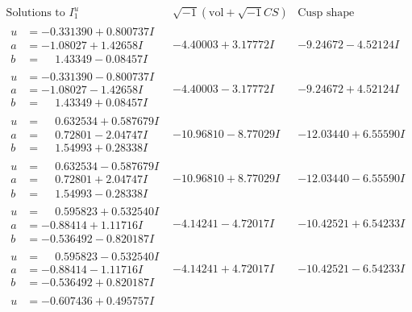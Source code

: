 \documentclass[1p]{elsarticle_modified}
\theoremstyle{definition}
\newcommand{\I}{\sqrt{-1}}
\begin{document}
$$\begin{array}{c|c|c}  
\text{Solutions to }I^u_{1}& \I (\text{vol} + \sqrt{-1}CS) & \text{Cusp shape}\\
 \hline 
\begin{aligned}
u &= -0.331390 + 0.800737 I \\
a &= -1.08027 + 1.42658 I \\
b &= \phantom{-}1.43349 - 0.08457 I\end{aligned}
 & -4.40003 + 3.17772 I & -9.24672 - 4.52124 I \\ \hline\begin{aligned}
u &= -0.331390 - 0.800737 I \\
a &= -1.08027 - 1.42658 I \\
b &= \phantom{-}1.43349 + 0.08457 I\end{aligned}
 & -4.40003 - 3.17772 I & -9.24672 + 4.52124 I \\ \hline\begin{aligned}
u &= \phantom{-}0.632534 + 0.587679 I \\
a &= \phantom{-}0.72801 - 2.04747 I \\
b &= \phantom{-}1.54993 + 0.28338 I\end{aligned}
 & -10.96810 - 8.77029 I & -12.03440 + 6.55590 I \\ \hline\begin{aligned}
u &= \phantom{-}0.632534 - 0.587679 I \\
a &= \phantom{-}0.72801 + 2.04747 I \\
b &= \phantom{-}1.54993 - 0.28338 I\end{aligned}
 & -10.96810 + 8.77029 I & -12.03440 - 6.55590 I \\ \hline\begin{aligned}
u &= \phantom{-}0.595823 + 0.532540 I \\
a &= -0.88414 + 1.11716 I \\
b &= -0.536492 - 0.820187 I\end{aligned}
 & -4.14241 - 4.72017 I & -10.42521 + 6.54233 I \\ \hline\begin{aligned}
u &= \phantom{-}0.595823 - 0.532540 I \\
a &= -0.88414 - 1.11716 I \\
b &= -0.536492 + 0.820187 I\end{aligned}
 & -4.14241 + 4.72017 I & -10.42521 - 6.54233 I \\ \hline\begin{aligned}
u &= -0.607436 + 0.495757 I \\

\end{aligned}
\end{array}$$
\end{document}

